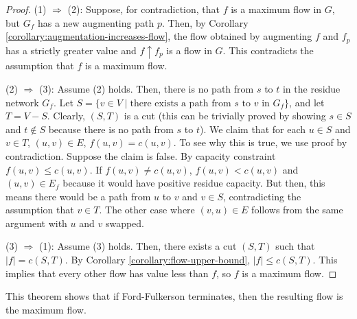 \begin{proof}
    \hfill

    (1) $\Rightarrow$ (2): Suppose, for contradiction, that $f$ is a maximum flow in $G$, but $G_f$ has a new augmenting path $p$. Then, by Corollary \ref{corollary:augmentation-increases-flow}, the flow obtained by augmenting $f$ and $f_p$ has a strictly greater value and $f \uparrow f_p$ is a flow in $G$. This contradicts the assumption that $f$ is a maximum flow. 

    (2) $\Rightarrow$ (3): Assume (2) holds. Then, there is no path from $s$ to $t$ in the residue network $G_f$. Let $S = \{ v \in V \mid \text{there exists a path from $s$ to $v$ in $G_f$} \}$, and let $T = V-S$. Clearly, $(S,T)$ is a cut (this can be trivially proved by showing $s \in S$ and $t \not\in S$ because there is no path from $s$ to $t$). We claim that for each $u\in S$ and $v \in T$, $(u,v) \in E$, $f(u,v) = c(u,v)$. To see why this is true, we use proof by contradiction. Suppose the claim is false. By capacity constraint $f(u,v) \leq c(u,v)$. If $f(u,v) \neq c(u,v)$, $f(u,v) < c(u,v)$ and $(u,v) \in E_f$ because it would have positive residue capacity. But then, this means there would be a path from $u$ to $v$ and $v \in S$, contradicting the assumption that $v \in T$. The other case where $(v,u) \in E$ follows from the same argument with $u$ and $v$ swapped.

    (3) $\Rightarrow$ (1): Assume (3) holds. Then, there exists a cut $(S,T)$ such that $|f| = c(S,T)$. By Corollary \ref{corollary:flow-upper-bound}, $|f| \leq c(S,T)$. This implies that every other flow has value less than $f$, so $f$ is a maximum flow.
\end{proof}

This theorem shows that if Ford-Fulkerson terminates, then the resulting flow is the maximum flow.